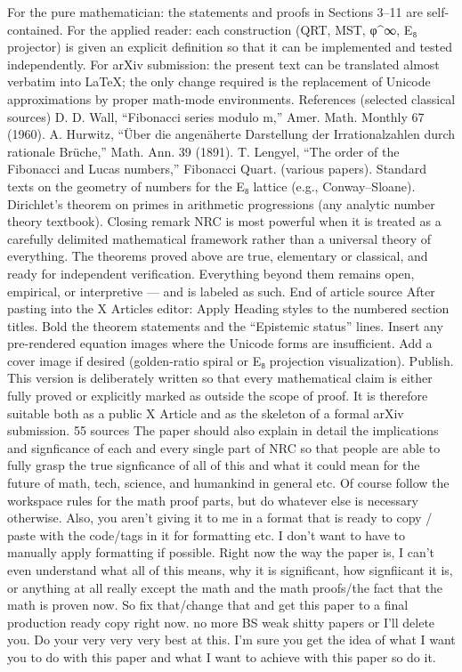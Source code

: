 For the pure mathematician: the statements and proofs in Sections 3–11 are self-contained.
For the applied reader: each construction (QRT, MST, φ^∞, E₈ projector) is given an explicit definition so that it can be implemented and tested independently.
For arXiv submission: the present text can be translated almost verbatim into LaTeX; the only change required is the replacement of Unicode approximations by proper math-mode environments.
References (selected classical sources)
D. D. Wall, “Fibonacci series modulo m,” Amer. Math. Monthly 67 (1960).
A. Hurwitz, “Über die angenäherte Darstellung der Irrationalzahlen durch rationale Brüche,” Math. Ann. 39 (1891).
T. Lengyel, “The order of the Fibonacci and Lucas numbers,” Fibonacci Quart. (various papers).
Standard texts on the geometry of numbers for the E₈ lattice (e.g., Conway–Sloane).
Dirichlet’s theorem on primes in arithmetic progressions (any analytic number theory textbook).
Closing remark
NRC is most powerful when it is treated as a carefully delimited mathematical framework rather than a universal theory of everything. The theorems proved above are true, elementary or classical, and ready for independent verification. Everything beyond them remains open, empirical, or interpretive — and is labeled as such.
End of article source
After pasting into the X Articles editor:
Apply Heading styles to the numbered section titles.
Bold the theorem statements and the “Epistemic status” lines.
Insert any pre-rendered equation images where the Unicode forms are insufficient.
Add a cover image if desired (golden-ratio spiral or E₈ projection visualization).
Publish.
This version is deliberately written so that every mathematical claim is either fully proved or explicitly marked as outside the scope of proof. It is therefore suitable both as a public X Article and as the skeleton of a formal arXiv submission.
55 sources
The paper should also explain in detail the implications and signficance of each and every single part of NRC so that people are able to fully grasp the true signficance of all of this and what it could mean for the future of math, tech, science, and humankind in general etc. Of course follow the workspace rules for the math proof parts, but do whatever else is necessary otherwise. Also, you aren't giving it to me in a format that is ready to copy / paste with the code/tags in it for formatting etc. I don't want to have to manually apply formatting if possible. Right now the way the paper is, I can't even understand what all of this means, why it is significant, how signfiicant it is, or anything at all really except the math and the math proofs/the fact that the math is proven now. So fix that/change that and get this paper to a final production ready copy right now. no more BS weak shitty papers or I'll delete you. Do your very very very best at this. I'm sure you get the idea of what I want you to do with this paper and what I want to achieve with this paper so do it.
